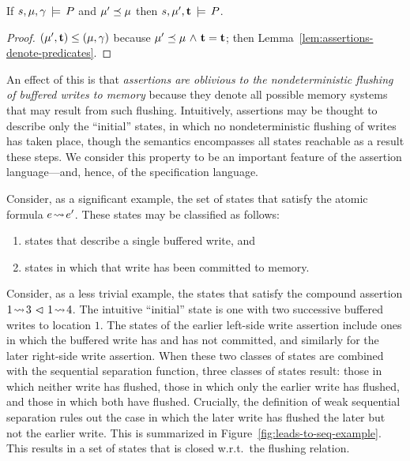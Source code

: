 \documentclass[11pt]{report}
\begin{document}
\begin{corollary}
  If $s,\mu,\gamma \,\models\, P$ and $\mu' \preceq \mu$ then $s,\mu',\mathbf{t} \,\models\, P$. 
\end{corollary}

\begin{proof}
$(\mu',\mathbf{t}) \leq (\mu,\gamma)$ because $\mu' \preceq \mu \operatorname{\,\wedge\,} \mathbf{t} = \mathbf{t}$; then Lemma~\ref{lem:assertions-denote-predicates}. 
\end{proof}

An effect of this is that \emph{assertions are oblivious to the nondeterministic flushing of buffered writes to memory} because they denote all possible memory systems that may result from such flushing. Intuitively, assertions may be thought to describe only the ``initial'' states, in which no nondeterministic flushing of writes has taken place, though the semantics encompasses all states reachable as a result these steps. We consider this property to be an important feature of the assertion language---and, hence, of the specification language. 

Consider, as a significant example, the set of states that satisfy the atomic formula $e \!\leadsto\! e'$. These states may be classified as follows: \begin{enumerate}
    \item states that describe a single buffered write, and 
    \item states in which that write has been committed to memory. 
\end{enumerate} Consider, as a less trivial example, the states that satisfy the compound assertion $1 \!\leadsto\! 3 \operatorname{\,\vartriangleleft\,} 1 \!\leadsto\! 4$. The intuitive ``initial'' state is one with two successive buffered writes to location $1$. The states of the earlier left-side write assertion include ones in which the buffered write has and has not committed, and similarly for the later right-side write assertion. When these two classes of states are combined with the sequential separation function, three classes of states result: those in which neither write has flushed, those in which only the earlier write has flushed, and those in which both have flushed. Crucially, the definition of weak sequential separation rules out the case in which the later write has flushed the later but not the earlier write. This is summarized in Figure~\ref{fig:leads-to-seq-example}. This results in a set of states that is closed w.r.t.~the flushing relation. 
 
\end{document}

